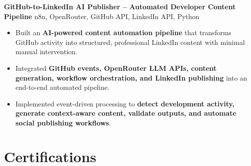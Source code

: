 \documentclass[a4paper,11pt]{article}
\newcommand{\resumeItem}[1]{
    \item \small{#1 \vspace{-2pt}}
}
\newcommand{\resumeProject}[2]{
    \vspace{2pt}
    \textbf{#1} \hfill {\small #2}
    \vspace{2pt}
}
\begin{document}
\vspace{1mm}

\resumeProject
{GitHub-to-LinkedIn AI Publisher -- Automated Developer Content Pipeline}
{n8n, OpenRouter, GitHub API, LinkedIn API, Python}

\begin{itemize}[leftmargin=*]

\resumeItem{Built an \textbf{AI-powered content automation pipeline} that transforms GitHub activity into structured, professional LinkedIn content with minimal manual intervention.}

\resumeItem{Integrated \textbf{GitHub events, OpenRouter LLM APIs, content generation, workflow orchestration, and LinkedIn publishing} into an end-to-end automated pipeline.}

\resumeItem{Implemented event-driven processing to \textbf{detect development activity, generate context-aware content, validate outputs, and automate social publishing workflows}.}

\end{itemize}

\vspace{-8pt}


\section{Certifications}
\end{document}
